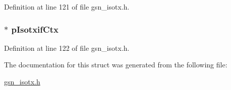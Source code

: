 Definition at line 121 of file gsn\_\-isotx.h.

\hypertarget{a00102_afffdfa8aef1548f076e03123267d83d6}{
\subsubsection[{pIsotxifCtx}]{$\ast$ {\bf pIsotxifCtx}}}
\label{a00102_afffdfa8aef1548f076e03123267d83d6}


Definition at line 122 of file gsn\_\-isotx.h.



The documentation for this struct was generated from the following file:\begin{DoxyCompactItemize}
\item 
\hyperlink{a00520}{gsn\_\-isotx.h}\end{DoxyCompactItemize}
